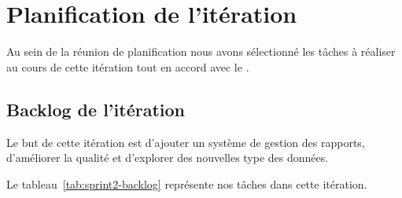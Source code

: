 \section{Planification de l'itération}

Au sein de la réunion de planification nous avons sélectionné les tâches à
réaliser au cours de cette itération tout en accord avec le .

\subsection{Backlog de l'itération}

Le but de cette itération est d'ajouter un système de gestion des rapports,
d'améliorer la qualité et d'explorer des nouvelles type des données.

Le tableau~\ref{tab:sprint2-backlog} représente nos tâches dans cette
itération.

